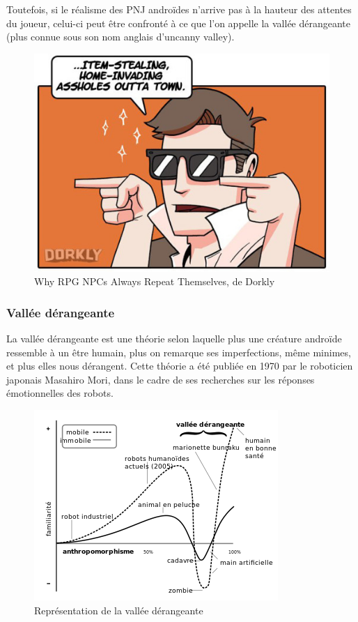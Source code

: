 \documentclass[a4paper, 12pt]{article} %
\begin{document}
Toutefois, si le réalisme des PNJ androïdes n’arrive pas à la hauteur des attentes du joueur, celui-ci peut être confronté à ce que l'on appelle la vallée dérangeante (plus connue sous son nom anglais d’uncanny valley).

\begin{figure}[!h]%
	\begin{center} 
		\includegraphics[width=0.60\columnwidth]{images/repeat4.png}%
		\caption{Why RPG NPCs Always Repeat Themselves, de Dorkly}%
	\end{center}
\end{figure}

\newpage
\subsubsection{Vallée dérangeante}

La vallée dérangeante\cite{vallee} est une théorie selon laquelle plus une créature androïde ressemble à un être humain, plus on remarque ses imperfections, même minimes, et plus elles nous dérangent. Cette théorie a été publiée en 1970 par le roboticien japonais Masahiro Mori, dans le cadre de ses recherches sur les réponses émotionnelles des robots.

\begin{figure}[!h]%
	\begin{center} 
		\includegraphics[width=0.60\columnwidth]{images/uncannyValley.png}%
		\caption{Représentation de la vallée dérangeante}%
	\end{center}
\end{figure}
\end{document}
